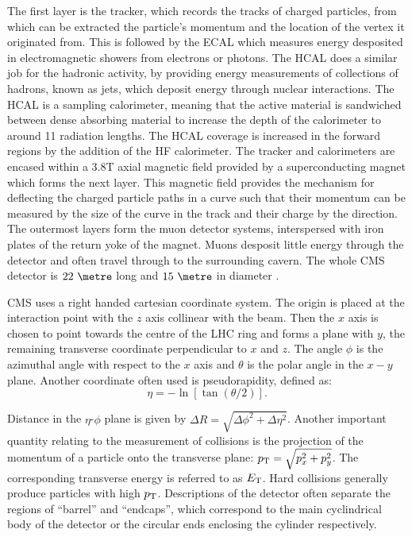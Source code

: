 The first layer is the tracker, which records the tracks of charged particles,
from which can be extracted the particle's momentum and the location of the
vertex it originated from. This is followed by the \ac{ECAL} which measures
energy desposited in electromagnetic showers from electrons or photons. The
\ac{HCAL} does a similar job for the hadronic activity, by providing energy
measurements of collections of hadrons, known as jets, which deposit energy
through nuclear interactions. The \ac{HCAL} is a sampling calorimeter, meaning
that the active material is sandwiched between dense absorbing material to
increase the depth of the calorimeter to around 11 radiation lengths. The
\ac{HCAL} coverage is increased in the forward regions by the addition of 
the \ac{HF} calorimeter. The tracker and calorimeters are encased within a 3.8T axial magnetic
field provided by a superconducting magnet which forms the next layer. This
magnetic field provides the mechanism for deflecting the charged particle paths in
a curve such that their momentum can be measured by the size of the curve in the
track and their charge by the direction. The
outermost layers form the muon detector systems, interspersed with iron plates
of the return yoke of the magnet. Muons desposit little energy
through the detector and often travel through to the surrounding cavern. The
whole CMS detector is $22~\metre$ long and $15~\metre$ in diameter
\cite{Chatrchyan:2008aa}.

CMS uses a right handed cartesian coordinate system. The
origin is placed at the interaction point with the $z$ axis collinear with the
beam. Then the $x$ axis is chosen to point towards the centre of the LHC ring
and forms a plane with $y$, the remaining transverse coordinate perpendicular to
$x$ and $z$. The angle $\phi$ is the azimuthal angle with respect to the $x$
axis and $\theta$ is the polar angle in the $x-y$ plane. Another coordinate
often used is pseudorapidity, defined as:
\begin{equation}
\eta = - \ln[\tan(\theta/2)]. 
\end{equation}

Distance in the $\eta$-$\phi$ plane is given by $\Delta R =
\sqrt{\Delta\phi^{2} + \Delta\eta^{2}}$.
Another important quantity relating to the measurement of collisions is the
projection of the momentum of a particle onto the transverse plane: $p_{\mathrm{T}} =
\sqrt{p_{x}^{2} + p_{y}^{2}}$. The corresponding transverse energy is referred
to as $E_{\text T}$. Hard collisions generally produce particles with
high $p_{\mathrm{T}}$. Descriptions of the detector often separate the regions of
``barrel'' and ``endcaps'', which correspond to the main cyclindrical body of
the detector or the circular ends enclosing the cylinder respectively. 


